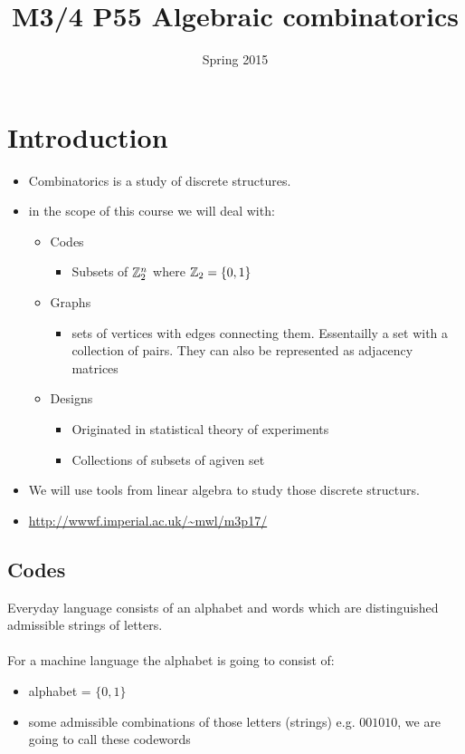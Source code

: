\documentclass[]{article}
\title{M3/4 P55 Algebraic combinatorics}
\date{Spring 2015}
\theoremstyle{definition}
\theoremstyle{remark}
\numberwithin{equation}{section}
\begin{document}
\maketitle

\tableofcontents

\section*{Introduction}
	\begin{itemize}
		\item Combinatorics is a study of discrete structures.
		\item in the scope of this course we will deal with:
		\begin{itemize}
			\item Codes
				\begin{itemize}
				\item Subsets of $\mathbb{Z}_2^n$ where $\mathbb{Z}_2 = \{0,1\}$
				\end{itemize}
			\item Graphs
				\begin{itemize}
				\item sets of vertices with edges connecting them. Essentailly a set with a collection of pairs. They can also be represented as adjacency matrices
				\end{itemize}
			\item Designs 
				\begin{itemize}
					\item Originated in statistical theory of experiments
					\item Collections of subsets of agiven set
				\end{itemize}
		\end{itemize}
		\item We will use tools from linear algebra to study those discrete structurs.
		\item \url{http://wwwf.imperial.ac.uk/~mwl/m3p17/}
	\end{itemize}

\subsection{Codes}
	Everyday language consists of an alphabet and words which are distinguished admissible strings of letters.\\
	\\
	For a machine language the alphabet is going to consist of:
	\begin{itemize}
		\item alphabet = $\{0,1\}$
		\item some admissible combinations of those letters (strings) e.g. $001010$, we are going to call these codewords
	\end{itemize}
\end{document}
